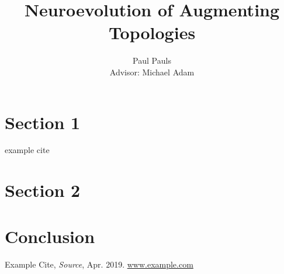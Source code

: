 \documentclass[journal, a4paper]{IEEEtran}
\begin{document}
  \title{Neuroevolution of Augmenting Topologies}
  \author{Paul Pauls\\
          Advisor: Michael Adam}
  \maketitle

\begin{abstract}
\blindtext
\end{abstract}


\section{Section 1}

\blindtext
example cite \cite{cite01}




\section{Section 2}

\blindtext




\section{Conclusion}

\blindtext




\begin{thebibliography}{5}

    Example Cite, {\em Source}, Apr. 2019.
    \url{www.example.com}

\end{thebibliography}
\end{document}
